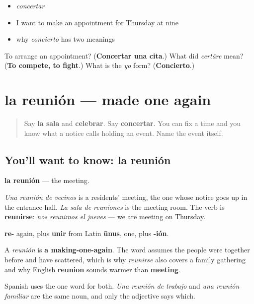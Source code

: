 \begin{itemize}
\raggedright
  \item \emph{concertar}
  \item I want to make an appointment for Thursday at nine
  \item why \emph{concierto} has two meanings
\end{itemize}

\begin{tcolorbox}[breakable,colback=teal!4,colframe=teal!35!black,title={Before you move on}]
To arrange an appointment? (\textbf{Concertar una cita}.) What did \emph{certāre} mean? (\textbf{To compete, to fight}.) What is the \emph{yo} form? (\textbf{Concierto}.)
\end{tcolorbox}
\section[la reunión]{la reunión — made one again}

\label{lesson:ES-C442-reunion}



\begin{quote}
Say \textbf{la sala} and \textbf{celebrar}. Say \textbf{concertar}. You can fix a time and you know what a notice calls holding an event. Name the event itself.
\end{quote}

\subsection*{You'll want to know: la reunión}
\textbf{la reunión} — the meeting.

\emph{Una reunión de vecinos} is a residents' meeting, the one whose notice goes up in the entrance hall. \emph{La sala de reuniones} is the meeting room. The verb is \textbf{reunirse}: \emph{nos reunimos el jueves} — we are meeting on Thursday.

\begin{cousinweb}
\textbf{re-} again, plus \textbf{unir} from Latin \textbf{ūnus}, one, plus \textbf{-ión}.

A \emph{reunión} is \textbf{a making-one-again}. The word assumes the people were together before and have scattered, which is why \emph{reunirse} also covers a family gathering and why English \textbf{reunion} sounds warmer than \textbf{meeting}.

Spanish uses the one word for both. \emph{Una reunión de trabajo} and \emph{una reunión familiar} are the same noun, and only the adjective says which.
\end{cousinweb}

